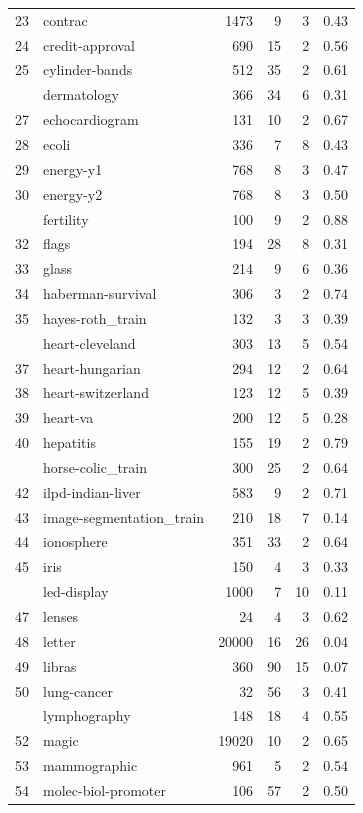 \documentclass[]{elsarticle} %
\begin{document}
\begin{longtable}[t]{rlrrrr}
23 & contrac & 1473 & 9 & 3 & 0.43\\
24 & credit-approval & 690 & 15 & 2 & 0.56\\
25 & cylinder-bands & 512 & 35 & 2 & 0.61\\
\addlinespace
26 & dermatology & 366 & 34 & 6 & 0.31\\
27 & echocardiogram & 131 & 10 & 2 & 0.67\\
28 & ecoli & 336 & 7 & 8 & 0.43\\
29 & energy-y1 & 768 & 8 & 3 & 0.47\\
30 & energy-y2 & 768 & 8 & 3 & 0.50\\
\addlinespace
31 & fertility & 100 & 9 & 2 & 0.88\\
32 & flags & 194 & 28 & 8 & 0.31\\
33 & glass & 214 & 9 & 6 & 0.36\\
34 & haberman-survival & 306 & 3 & 2 & 0.74\\
35 & hayes-roth\_train & 132 & 3 & 3 & 0.39\\
\addlinespace
36 & heart-cleveland & 303 & 13 & 5 & 0.54\\
37 & heart-hungarian & 294 & 12 & 2 & 0.64\\
38 & heart-switzerland & 123 & 12 & 5 & 0.39\\
39 & heart-va & 200 & 12 & 5 & 0.28\\
40 & hepatitis & 155 & 19 & 2 & 0.79\\
\addlinespace
41 & horse-colic\_train & 300 & 25 & 2 & 0.64\\
42 & ilpd-indian-liver & 583 & 9 & 2 & 0.71\\
43 & image-segmentation\_train & 210 & 18 & 7 & 0.14\\
44 & ionosphere & 351 & 33 & 2 & 0.64\\
45 & iris & 150 & 4 & 3 & 0.33\\
\addlinespace
46 & led-display & 1000 & 7 & 10 & 0.11\\
47 & lenses & 24 & 4 & 3 & 0.62\\
48 & letter & 20000 & 16 & 26 & 0.04\\
49 & libras & 360 & 90 & 15 & 0.07\\
50 & lung-cancer & 32 & 56 & 3 & 0.41\\
\addlinespace
51 & lymphography & 148 & 18 & 4 & 0.55\\
52 & magic & 19020 & 10 & 2 & 0.65\\
53 & mammographic & 961 & 5 & 2 & 0.54\\
54 & molec-biol-promoter & 106 & 57 & 2 & 0.50\\

\end{longtable}
\end{document}
